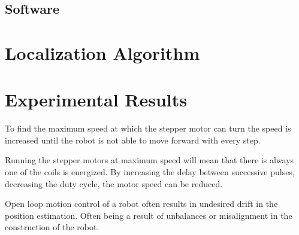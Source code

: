 \documentclass[letterpaper, 10 pt, conference]{ieeeconf}  %
\begin{document}

\subsection{Software}




\section{Localization Algorithm}






\section{Experimental Results}


To find the maximum speed at which the stepper motor can turn the speed is increased until the robot is not able to move forward with every step.

Running the stepper motors at maximum speed will mean that there is always one of the coils is energized.
By increasing the delay between successive pulses, decreasing the duty cycle, the motor speed can be reduced. 



Open loop motion control of a robot often results in undesired drift in the position estimation.
Often being a result of unbalances or misalignment in the construction of the robot.
\end{document}
